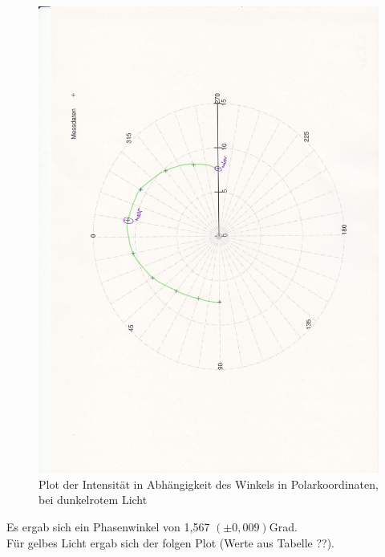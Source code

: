 \documentclass[12pt]{scrartcl}
\begin{document}
\begin{figure}[H]
\centering
    \includegraphics[scale = 0.3, angle = -90]{a_5_dr.pdf}
  	\caption[Plot der Intensität in Abhängigkeit des Winkels in Polarkoordinaten, bei dunkelrotem Licht]{Plot der Intensität in Abhängigkeit des Winkels in Polarkoordinaten, bei dunkelrotem Licht}
  \label{fig:a_5_dr}
\end{figure}

Es ergab sich ein Phasenwinkel von 1,567 $(\pm 0,009)$Grad.\\

Für gelbes Licht ergab sich der folgen Plot (Werte aus Tabelle ??).
\end{document}
